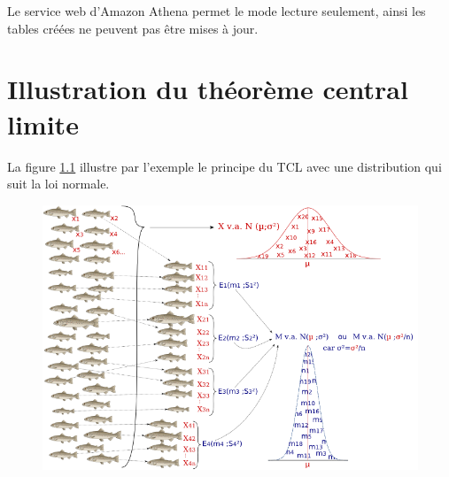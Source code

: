 Le service web d'Amazon Athena permet le mode lecture seulement, ainsi les tables créées ne peuvent pas être mises à jour. 









\appendix

\chapter{Illustration du théorème central limite} \label{appendix:clt-exemple}
La figure \ref{fig:tcl} illustre par l'exemple le principe du TCL avec une distribution qui suit la loi normale. 
\begin{figure}[H]
	\centering
	\includegraphics[width=1\linewidth]{illustrations/tcl}
	\caption{}
	\label{fig:tcl}
	
\end{figure}















